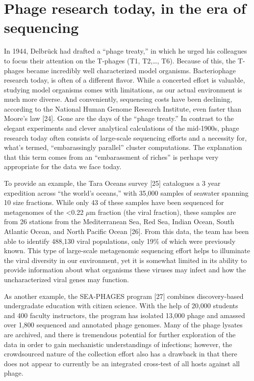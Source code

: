 \documentclass[12pt,twoside]{mitthesis-manusdown}
\begin{document}
\section{Phage research today, in the era of
sequencing}\label{phage-research-today-in-the-era-of-sequencing}

In 1944, Delbrück had drafted a ``phage treaty,'' in which he urged his
colleagues to focus their attention on the T-phages (T1, T2,\ldots{},
T6). Because of this, the T-phages became incredibly well characterized
model organisms. Bacteriophage research today, is often of a different
flavor. While a concerted effort is valuable, studying model organisms
comes with limitations, as our actual environment is much more diverse.
And conveniently, sequencing costs have been declining, according to the
National Human Genome Research Institute, even faster than Moore's law
{[}24{]}. Gone are the days of the ``phage treaty.'' In contrast to the
elegant experiments and clever analytical calculations of the mid-1900s,
phage research today often consists of large-scale sequencing efforts
and a necessity for, what's termed, ``embarassingly parallel'' cluster
computations. The explanation that this term comes from an
``embarassment of riches'' is perhaps very appropriate for the data we
face today.

To provide an example, the Tara Oceans survey {[}25{]} catalogues a 3
year expedition across ``the world's oceans,'' with 35,000 samples of
seawater spanning 10 size fractions. While only 43 of these samples have
been sequenced for metagenomes of the \textless{}0.22 \(\mu\)m fraction
(the viral fraction), these samples are from 26 stations from the
Mediterranean Sea, Red Sea, Indian Ocean, South Atlantic Ocean, and
North Pacific Ocean {[}26{]}. From this data, the team has been able to
identify 488,130 viral populations, only 19\% of which were previously
known. This type of large-scale metagenomic sequencing effort helps to
illuminate the viral diversity in our environment, yet it is somewhat
limited in its ability to provide information about what organisms these
viruses may infect and how the uncharacterized viral genes may function.

As another example, the SEA-PHAGES program {[}27{]} combines
discovery-based undergradate education with citizen science. With the
help of 20,000 students and 400 faculty instructors, the program has
isolated 13,000 phage and amassed over 1,800 sequenced and annotated
phage genomes. Many of the phage lysates are archived, and there is
tremendous potential for further exploration of the data in order to
gain mechanistic understandings of infections; however, the crowdsourced
nature of the collection effort also has a drawback in that there does
not appear to currently be an integrated cross-test of all hosts against
all phage.
\end{document}
